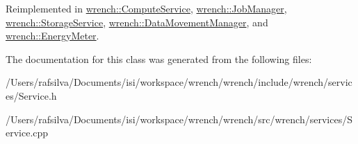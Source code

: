 Reimplemented in \hyperlink{classwrench_1_1_compute_service_a289d4a0c5254772575340095b73cf7d4}{wrench\+::\+Compute\+Service}, \hyperlink{classwrench_1_1_job_manager_af9c85f6a54e26f115fa09ef1c9327aa7}{wrench\+::\+Job\+Manager}, \hyperlink{classwrench_1_1_storage_service_a1267ad1722291f56532c283658f31acc}{wrench\+::\+Storage\+Service}, \hyperlink{classwrench_1_1_data_movement_manager_a72fc97280a6f1f475e168c1f71ec5f70}{wrench\+::\+Data\+Movement\+Manager}, and \hyperlink{classwrench_1_1_energy_meter_ab5191f00d7af7cff9cecb664d2e784d8}{wrench\+::\+Energy\+Meter}.



The documentation for this class was generated from the following files\+:\begin{DoxyCompactItemize}
\item 
/\+Users/rafsilva/\+Documents/isi/workspace/wrench/wrench/include/wrench/services/Service.\+h\item 
/\+Users/rafsilva/\+Documents/isi/workspace/wrench/wrench/src/wrench/services/Service.\+cpp\end{DoxyCompactItemize}
